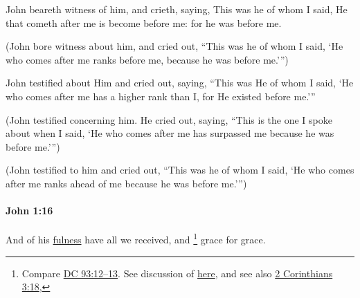 			\begin{framed}
			\scriptsize
				\begin{compactdesc}
					\item[SBLG] 
					\item[ASV] John beareth witness of him, and crieth, saying, This was he of whom I said, He that cometh after me is become before me: for he was before me.
					\item[ESV] (John bore witness about him, and cried out, ``This was he of whom I said, `He who comes after me ranks before me, because he was before me.''')
					\item[NASB] John testified about Him and cried out, saying, ``This was He of whom I said, `He who comes after me has a higher rank than I, for He existed before me.'''
					\item[NIV] (John testified concerning him. He cried out, saying, ``This is the one I spoke about when I said, `He who comes after me has surpassed me because he was before me.''')
					\item[NRSV] (John testified to him and cried out, ``This was he of whom I said, `He who comes after me ranks ahead of me because he was before me.''')
				\end{compactdesc}
			\end{framed}

		\paragraph{John 1:16} %
			\label{JOHN-1-16}

			And of his \hyperref[FULNESS]{fulness} have all we received, and
				\footnote{%
					Compare \hyperref[DC93-12]{DC 93:12--13}. See discussion of  \hyperref[GRACE-PHRASES]{here}, and see also \hyperref[2CORINTHIANS-3-18]{2 Corinthians 3:18}, 
					}%
			grace for grace.

